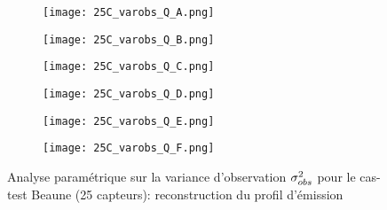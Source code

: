   
  \begin{figure}[p!]
  	\centering
  	\begin{subfigure}[t]{0.5\textwidth}
  		\centering
  		\texttt{[image: 25C\_varobs\_Q\_A.png]}
  		\caption{}
  		\label{varA_q}
  	\end{subfigure}%
  	\begin{subfigure}[t]{0.5\textwidth}
  		\centering
  		\texttt{[image: 25C\_varobs\_Q\_B.png]}
  		\caption{}
  		\label{varB_q}
  	\end{subfigure}
  	\begin{subfigure}[t]{0.5\textwidth}
  		\centering
  		\texttt{[image: 25C\_varobs\_Q\_C.png]}
  		\caption{}
  		\label{varC_q}
  	\end{subfigure}%
  	\begin{subfigure}[t]{0.5\textwidth}
  		\centering
  		\texttt{[image: 25C\_varobs\_Q\_D.png]}
  		\caption{}
  		\label{varD_q}
  	\end{subfigure}
  	\begin{subfigure}[t]{0.5\textwidth}
  		\centering
  		\texttt{[image: 25C\_varobs\_Q\_E.png]}
  		\caption{}
  		\label{varE_q}
  	\end{subfigure}%
  	\begin{subfigure}[t]{0.5\textwidth}
  		\centering
  		\texttt{[image: 25C\_varobs\_Q\_F.png]}
  		\caption{}
  		\label{varF_q}
  	\end{subfigure}
  	\caption{Analyse paramétrique sur la variance d'observation ${\sigma_{obs}^2}$ pour le cas-test Beaune (25 capteurs): reconstruction du profil d'émission}
  	\label{fig_25C_analyse_varobs_q}
  \end{figure}
  